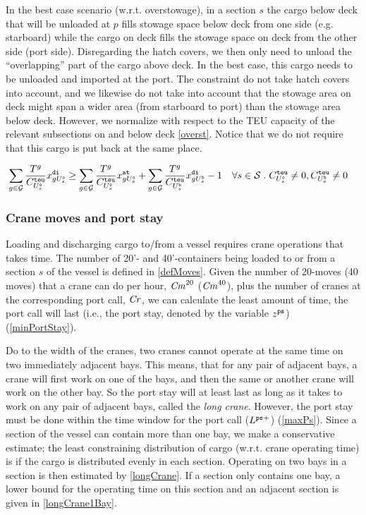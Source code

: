 In the best case scenario (w.r.t. overstowage), in a section $s$ the cargo below deck that will be unloaded at $p$ fills stowage space below deck from one side (e.g. starboard) while the cargo on deck fills the stowage space on deck from the other side (port side). Disregarding the hatch covers, we then only need to unload the ``overlapping'' part of the cargo above deck.
In the best case, this cargo needs to be unloaded and imported at the port.  
The constraint do not take hatch covers into account, and we likewise do not take into account that the stowage area on deck might span a wider area (from starboard to port) than the stowage area below deck. However, we normalize with respect to the TEU capacity of the relevant subsections on and below deck \eqref{overst}. 
Notice that we do not require that this cargo is put back at the same place.

\begin{eqnarray}
\label{overst}
\sum_{g\in \mathcal{G}} \frac{T^g}{C^\texttt{teu}_{U^\texttt{o}_s}}x^\texttt{di}_{gU^\texttt{o}_s} 
\geq \sum_{g\in \mathcal{G}}\frac{T^g}{C^{\texttt{teu}}_{U^\texttt{o}_s}}x^\texttt{at}_{gU^\texttt{o}_s} + \sum_{g\in \mathcal{G}}\frac{T^g}{C^{\texttt{teu}}_{U^\texttt{b}_s}}x^\texttt{di}_{gU^\texttt{b}_s} - 1\quad
																																										&\forall s\in\mathcal{S}\;.\;C^{\texttt{teu}}_{U^\texttt{o}_s}\neq 0, C^{\texttt{teu}}_{U^\texttt{b}_s}\neq 0
\end{eqnarray}

\subsubsection{Crane moves and port stay}
Loading and discharging cargo to/from a vessel requires crane operations that takes time. The number of 20'- and 40'-containers being loaded to or from a section $s$ of the vessel is defined in \eqref{defMoves}. Given the number of 20-moves (40 moves) that a crane can do per hour, $\mathit{Cm}^{20}$ ($\mathit{Cm}^{40}$), plus the number of cranes at the corresponding port call, $\mathit{Cr}$, we can calculate the least amount of time, the port call will last (i.e., the port stay, denoted by the variable $z^\texttt{ps}$) (\ref{minPortStay}).  

Do to the width of the cranes, two cranes cannot operate at the same time on two immediately adjacent bays. This means, that for any pair of adjacent bays, a crane will first work on one of the bays, and then the same or another crane will work on the other bay. So the port stay will at least last as long as it takes to work on any pair of adjacent bays, called the \emph{long crane}. However, the port stay must be done within the time window for the port call ($L^{\texttt{ps}+}$) (\ref{maxPs}). Since a section of the vessel can contain more than one bay, we make a conservative estimate; the least constraining distribution of cargo (w.r.t. crane operating time) is if the cargo is distributed evenly in each section. Operating on two bays in a section is then estimated by \eqref{longCrane}. If a section only contains one bay, a lower bound for the operating time on this section and an adjacent section is given in \eqref{longCrane1Bay}.

